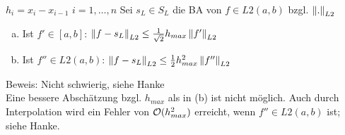 $h_i = x_i - x_{i-1}\,\,i=1,\ldots,n$
 Sei $s_L \in S_L$ die BA von $f \in L2(a,b)$ bzgl. $\left\lVert . \right\rVert_{L2}$
\begin{enumerate}[(a)]
  \item Ist $f' \in [a,b]$: $\left\lVert f-s_L \right\rVert_{L2} \leq \frac{1}{\sqrt{2}} h_{max} \left\lVert f' \right\rVert_{L2}$
  \item Ist $f'' \in L2(a,b)$: $\left\lVert f-s_L \right\rVert_{L2} \leq \frac{1}{2} h^2_{max} \left\lVert f'' \right\rVert_{L2}$
\end{enumerate}
Beweis: Nicht schwierig, siehe Hanke\\
Eine bessere Abschätzung bzgl. $h_{max}$ als in (b) ist nicht möglich.
Auch durch Interpolation wird ein Fehler von $\mathcal{O}(h^2_{max})$ erreicht,
wenn $f'' \in L2(a,b)$ ist; siehe Hanke.
